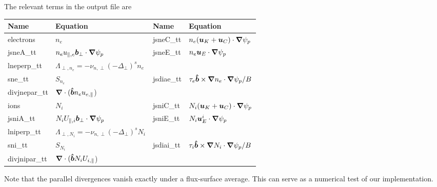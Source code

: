 The relevant terms in the output file are
\begin{longtable}{llll}
\toprule
\rowcolor{gray!50}\textbf{Name} &  \textbf{Equation} & \textbf{Name} &  \textbf{Equation}\\
\midrule
    electrons & $n_e$ &
    jsneC\_tt &$ n_e ( {\boldsymbol{u}}_K + {\boldsymbol{u}}_C )\cdot{\boldsymbol{\nabla}} \psi_p$ \\
    jsneA\_tt &$ n_e u_{\parallel,e} {\boldsymbol{ b}}_\perp  \cdot{\boldsymbol{\nabla}} \psi_p$ &
    jsneE\_tt & $ n_e {\boldsymbol{u}}_E\cdot{\boldsymbol{\nabla}}\psi_p$ \\
    lneperp\_tt &$ \Lambda_{\perp,n_e} = -\nu_{n,\perp} (-\Delta_\perp)^s n_e$&
    & \\
    sne\_tt & $S_{n_e}$ &
    jsdiae\_tt & $\tau_e \bm{\hat{b}} \times {\boldsymbol{\nabla}} n_e \cdot{\boldsymbol{\nabla}} \psi_p /B$\\
    divjnepar\_tt & ${\boldsymbol{\nabla}}\cdot (\bm{\hat{b}} n_e u_{e,\parallel}$) &
    & \\
    ions & $N_i$ &
    jsniC\_tt &$ N_i ( {\boldsymbol{u}}_K + {\boldsymbol{u}}_C )\cdot{\boldsymbol{\nabla}} \psi_p$ \\
    jsniA\_tt &$ N_i U_{\parallel,i} {\boldsymbol{ b}}_\perp  \cdot{\boldsymbol{\nabla}} \psi_p$ &
    jsniE\_tt & $ N_i {\boldsymbol{u}}^i_E\cdot{\boldsymbol{\nabla}}\psi_p$ \\
    lniperp\_tt &$ \Lambda_{\perp,N_i} = -\nu_{n,\perp} (-\Delta_\perp)^s N_i$&
    & \\
    sni\_tt & $S_{N_i}$ &
    jsdiai\_tt & $\tau_i \bm{\hat{b}} \times {\boldsymbol{\nabla}} N_i \cdot{\boldsymbol{\nabla}} \psi_p /B$\\
    divjnipar\_tt & ${\boldsymbol{\nabla}}\cdot (\bm{\hat{b}} N_i U_{i,\parallel}$) &
      & \\
\bottomrule
\end{longtable}



Note that the parallel divergences vanish exactly under a flux-surface average. This can serve as a numerical test of our implementation.
